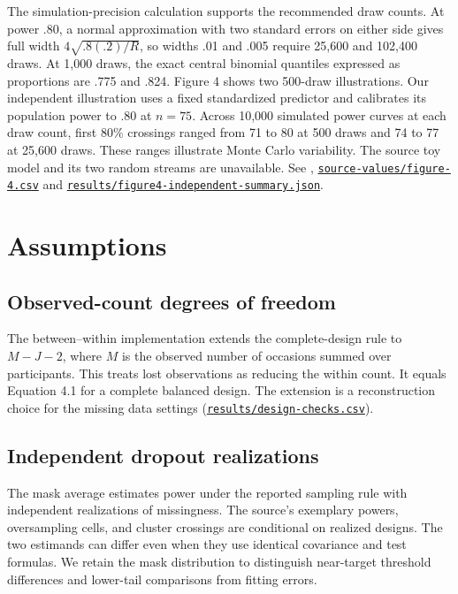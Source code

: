 The simulation-precision calculation supports the recommended draw counts. At power .80, a normal approximation with two standard errors on either side gives full width \(4\sqrt{.8(.2)/R}\), so widths .01 and .005 require 25,600 and 102,400 draws. At 1,000 draws, the exact central binomial quantiles expressed as proportions are .775 and .824. Figure 4 shows two 500-draw illustrations. Our independent illustration uses a fixed standardized predictor and calibrates its population power to .80 at $n=75$. Across 10,000 simulated power curves at each draw count, first 80\% crossings ranged from 71 to 80 at 500 draws and 74 to 77 at 25,600 draws. These ranges illustrate Monte Carlo variability. The source toy model and its two random streams are unavailable. See \citet[pp.~59--64]{kupzyk2011}, \href{https://github.com/alectionary/vibe-math/blob/master/formalization/kupzyk-power-assumptions/source-values/figure-4.csv}{\nolinkurl{source-values/figure-4.csv}} and \href{https://github.com/alectionary/vibe-math/blob/master/formalization/kupzyk-power-assumptions/results/figure4-independent-summary.json}{\nolinkurl{results/figure4-independent-summary.json}}.

\section{Assumptions}\label{sec:assumptions}

\subsection{Observed-count degrees of freedom}\label{sec:observed}
The between--within implementation extends the complete-design rule to $M-J-2$, where $M$ is the observed number of occasions summed over participants. This treats lost observations as reducing the within count. It equals Equation 4.1 for a complete balanced design. The extension is a reconstruction choice for the missing data settings (\href{https://github.com/alectionary/vibe-math/blob/master/formalization/kupzyk-power-assumptions/results/design-checks.csv}{\nolinkurl{results/design-checks.csv}}).

\subsection{Independent dropout realizations}\label{sec:masks}
The mask average estimates power under the reported sampling rule with independent realizations of missingness. The source's exemplary powers, oversampling cells, and cluster crossings are conditional on realized designs. The two estimands can differ even when they use identical covariance and test formulas. We retain the mask distribution to distinguish near-target threshold differences and lower-tail comparisons from fitting errors.

